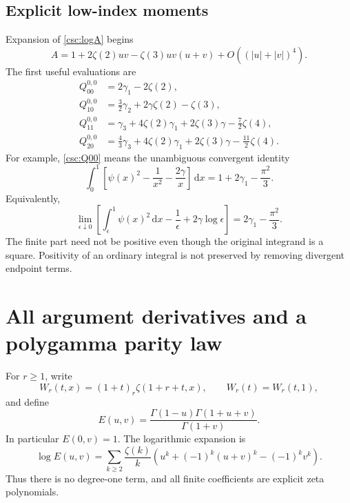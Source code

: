\documentclass[11pt,a4paper]{article}
\numberwithin{equation}{section}
\theoremstyle{definition}
\newcommand{\dd}{\,\mathrm dx}
\begin{document}
\subsection{Explicit low-index moments}
Expansion of \eqref{csc:logA} begins
\begin{equation}\label{csc:Astart}
A=1+2\zeta(2)uv-\zeta(3)uv(u+v)+O((|u|+|v|)^4).
\end{equation}
The first useful evaluations are
\begin{align}
Q_{00}^{0,0}&=2\gamma_1-2\zeta(2),\label{csc:Q00}\\
Q_{10}^{0,0}&=\frac32\gamma_2+2\gamma\zeta(2)-\zeta(3),\label{csc:Q10}\\
Q_{11}^{0,0}&=\gamma_3+4\zeta(2)\gamma_1+2\zeta(3)\gamma-\frac72\zeta(4),\label{csc:Q11}\\
Q_{20}^{0,0}&=\frac43\gamma_3+4\zeta(2)\gamma_1+2\zeta(3)\gamma-\frac{11}2\zeta(4).\label{csc:Q20}
\end{align}
For example, \eqref{csc:Q00} means the unambiguous convergent identity
\begin{equation}\label{csc:psiordinary}
\int_0^1\left[\psi(x)^2-\frac1{x^2}-\frac{2\gamma}{x}\right]\dd
=1+2\gamma_1-\frac{\pi^2}{3}.
\end{equation}
Equivalently,
\[
\lim_{\epsilon\downarrow0}\left[
\int_\epsilon^1\psi(x)^2\dd-\frac1\epsilon+2\gamma\log\epsilon\right]
=2\gamma_1-\frac{\pi^2}{3}.
\]
The finite part need not be positive even though the original integrand is a square. Positivity of an ordinary integral is not preserved by removing divergent endpoint terms.

\section{All argument derivatives and a polygamma parity law}\label{csc:derivatives}
For $r\ge1$, write
\begin{equation}\label{csc:Wr}
W_r(t,x)=(1+t)_r\zeta(1+r+t,x),\qquad W_r(t)=W_r(t,1),
\end{equation}
and define
\begin{equation}\label{csc:E}
E(u,v)=\frac{\Gamma(1-u)\Gamma(1+u+v)}{\Gamma(1+v)}.
\end{equation}
In particular $E(0,v)=1$. The logarithmic expansion is
\begin{equation}\label{csc:logE}
\log E(u,v)=\sum_{k\ge2}\frac{\zeta(k)}k
\left(u^k+(-1)^k(u+v)^k-(-1)^kv^k\right).
\end{equation}
Thus there is no degree-one term, and all finite coefficients are explicit zeta polynomials.
\end{document}
